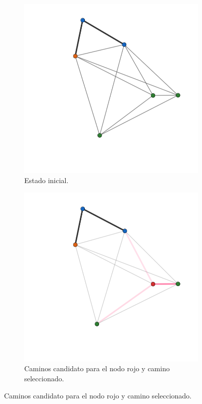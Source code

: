 \documentclass{article}
\begin{document}
\begin{figure}[H]
    \centering
    \begin{subfigure}[b]{0.45\textwidth}
        \centering
        \includegraphics[width=\textwidth]{imagenes/Grafos/Screenshots/Inicial.png}
        \caption{Estado inicial.}
    \end{subfigure}
    \begin{subfigure}[b]{0.45\textwidth}
        \centering
        \includegraphics[width=\textwidth]{imagenes/Grafos/Screenshots/Cambio2.png}
        \caption{Caminos candidato para el nodo rojo y camino seleccionado.}
    \end{subfigure}
\end{figure}
\end{document}
